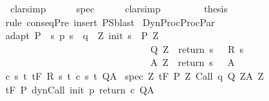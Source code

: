 \begin{isabellebody}
\ \ clarsimp\isanewline
\ \ \ \ \isamarkupfalse%
\ spec\isanewline
\ \ \ \ \isamarkupfalse%
\ clarsimp\isanewline
\ \ \ \ \isamarkupfalse%
\isanewline
\ \ \isamarkupfalse%
\ {\isacharquery}thesis\isanewline
\ \ \ \ \isamarkupfalse%
\ {\isacharparenleft}rule\ conseqPre{\isacharparenright}\ {\isacharparenleft}insert\ P{\isacharunderscore}S{\isacharcomma}blast{\isacharparenright}\isanewline
{}\isamarkupfalse%
%
\endisatagproof
{\isafoldproof}%
%
\isadelimproof
\isanewline
%
\endisadelimproof
\isanewline
\isanewline
\isanewline
{}\isamarkupfalse%
\ DynProcProcPar{\isacharcolon}\ \isanewline
{}\ adapt{\isacharcolon}\ {\isachardoublequoteopen}P\ {\isasymsubseteq}\ {\isacharbraceleft}s{\isachardot}\ p\ s\ {\isacharequal}\ q\ {\isasymand}\ {\isacharparenleft}{\isasymexists}Z{\isachardot}\ init\ s\ {\isasymin}\ P{\isacharprime}\ Z\ \ {\isasymand}\ \isanewline
\ \ \ \ \ \ \ \ \ \ \ \ \ \ \ \ \ \ \ \ \ \ \ \ \ \ \ \ {\isacharparenleft}{\isasymforall}{\isasymtau}{\isachardot}\ {\isasymtau}\ {\isasymin}\ Q{\isacharprime}\ Z\ {\isasymlongrightarrow}\ return\ s\ {\isasymtau}\ {\isasymin}\ R\ s\ {\isasymtau}{\isacharparenright}\ {\isasymand}\isanewline
\ \ \ \ \ \ \ \ \ \ \ \ \ \ \ \ \ \ \ \ \ \ \ \ \ \ \ \ {\isacharparenleft}{\isasymforall}{\isasymtau}{\isachardot}\ {\isasymtau}\ {\isasymin}\ A{\isacharprime}\ Z\ {\isasymlongrightarrow}\ return\ s\ {\isasymtau}\ {\isasymin}\ A{\isacharparenright}{\isacharparenright}{\isacharbraceright}{\isachardoublequoteclose}\isanewline
{}\ c{\isacharcolon}\ {\isachardoublequoteopen}{\isasymforall}s\ t{\isachardot}\ {\isasymGamma}{\isacharcomma}{\isasymTheta}{\isasymturnstile}\isactrlsub t\isactrlbsub {\isacharslash}F\isactrlesub \ {\isacharparenleft}R\ s\ t{\isacharparenright}\ {\isacharparenleft}c\ s\ t{\isacharparenright}\ Q{\isacharcomma}A{\isachardoublequoteclose}\isanewline
{}\ spec{\isacharcolon}\ {\isachardoublequoteopen}{\isasymforall}Z{\isachardot}\ {\isasymGamma}{\isacharcomma}{\isasymTheta}{\isasymturnstile}\isactrlsub t\isactrlbsub {\isacharslash}F\isactrlesub \ {\isacharparenleft}P{\isacharprime}\ Z{\isacharparenright}\ Call\ q\ {\isacharparenleft}Q{\isacharprime}\ Z{\isacharparenright}{\isacharcomma}{\isacharparenleft}A{\isacharprime}\ Z{\isacharparenright}{\isachardoublequoteclose}\isanewline
{}\ {\isachardoublequoteopen}{\isasymGamma}{\isacharcomma}{\isasymTheta}{\isasymturnstile}\isactrlsub t\isactrlbsub {\isacharslash}F\isactrlesub \ P\ {\isacharparenleft}dynCall\ init\ p\ return\ c{\isacharparenright}\ Q{\isacharcomma}A{\isachardoublequoteclose}\isanewline

\end{isabellebody}
